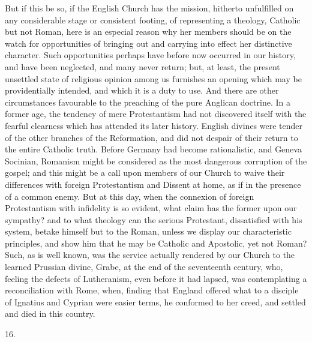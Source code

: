 But if this be so, if the English Church has the mission, hitherto
unfulfilled on any considerable stage or consistent footing, of
representing a theology, Catholic but not Roman, here is an especial
reason why her members should be on the watch for opportunities of
bringing out and carrying into effect her distinctive character. Such
opportunities perhaps have before now occurred in our history, and
have been neglected, and many never return; but, at least, the present
unsettled state of religious opinion among us furnishes an opening
which may be providentially intended, and which it is a duty to use.
And there are other circumstances favourable to the preaching of the
pure Anglican doctrine. In a former age, the tendency of mere
Protestantism had not discovered itself with the fearful clearness
which has attended its later history. English divines were tender of
the other branches of the Reformation, and did not despair of their
return to the entire Catholic truth. Before Germany had become
rationalistic, and Geneva Socinian, Romanism might be considered as
the most dangerous corruption of the gospel; and this might be a call
upon members of our Church to waive their differences with foreign
Protestantism and Dissent at home, as if in the presence of a common
enemy. But at this day, when the connexion of foreign Protestantism
with infidelity is so evident, what claim has the former upon our
sympathy? and to what theology can the serious Protestant,
dissatisfied with his system, betake himself but to the Roman, unless
we display our characteristic principles, and show him that he may be
Catholic and Apostolic, yet not Roman? Such, as is well known, was the
service actually rendered by our Church to the learned Prussian
divine, Grabe, at the end of the seventeenth century, who,
feeling the defects of Lutheranism, even before it had lapsed, was
contemplating a reconciliation with Rome, when, finding that England
offered what to a disciple of Ignatius and Cyprian were easier terms,
he conformed to her creed, and settled and died in this country.

16.

